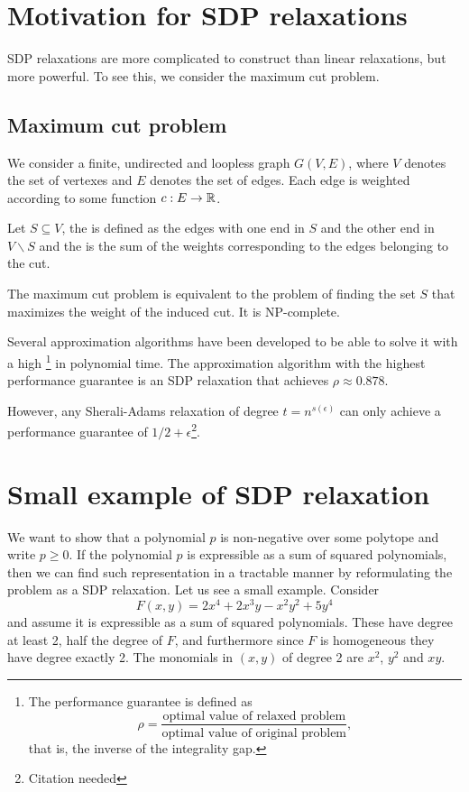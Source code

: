 \documentclass[a4paper,twoside,justified]{tufte-handout}
\begin{document}
 

\section{Motivation for SDP relaxations}
SDP relaxations are more complicated to construct than linear relaxations, but more powerful. To see this, we consider the maximum cut problem.

\subsection{Maximum cut problem\cite{poljak1995maximumcut}}
We consider a finite, undirected and loopless graph $G(V,E)$, where $V$ denotes the set of vertexes and $E$ denotes the set of edges. Each edge is weighted according to some function $c:E\rightarrow \mathbb{R}$. 

Let $S\subseteq V$, the  is defined as the edges with one end in $S$ and the other end in $V\backslash S$ and the  is the sum of the weights corresponding to the edges belonging to the cut. 

The maximum cut problem is equivalent to the problem of finding the set $S$ that maximizes the weight of the induced cut. It is NP-complete\cite{karp1972NPhard}.

Several approximation algorithms have been developed to be able to solve it with a high \footnote{The performance guarantee is defined as
\begin{equation*}
\rho=\frac{\text{optimal value of relaxed problem}}{\text{optimal value of original problem}},
\end{equation*}
that is, the inverse of the integrality gap.} in polynomial time. The approximation algorithm with the highest performance guarantee is an SDP relaxation that achieves $\rho\approx 0.878$.

However, any Sherali-Adams relaxation of degree $t=n^{s(\epsilon)}$ can only achieve a performance guarantee of $1/2 + \epsilon$\footnote{Citation needed}.

\section{Small example of SDP relaxation}
We want to show that a polynomial $p$ is non-negative over some polytope and write $p\geq 0$. If the polynomial $p$ is expressible as a sum of squared polynomials, then we can find such representation in a tractable manner by reformulating the problem as a SDP relaxation. Let us see a small example. Consider
\begin{equation*}
F(x,y)=2x^4+2x^3y-x^2y^2+5y^4
\end{equation*}
and assume it is expressible as a sum of squared polynomials. These have degree at least 2, half the degree of $F$, and furthermore since $F$ is homogeneous they have degree exactly 2. The monomials in $(x,y)$ of degree 2 are $x^2$, $y^2$ and $xy$.
\end{document}
